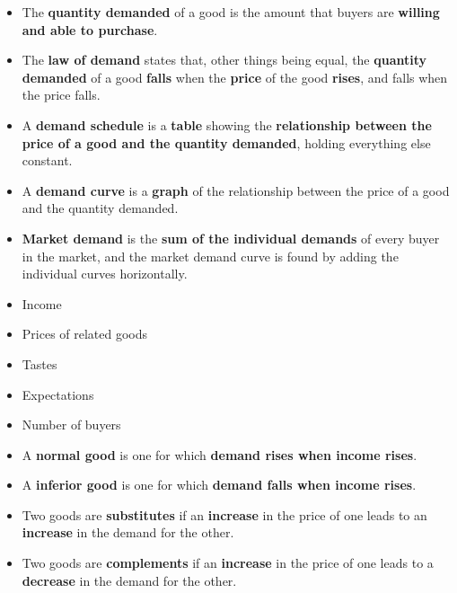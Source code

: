\documentclass[12pt,a4paper]{article}
\begin{document}

\begin{itemize}
    \item The \textbf{quantity demanded} of a good is the amount that buyers are \textbf{willing and able to purchase}.
    \item The \textbf{law of demand} states that, other things being equal, the \textbf{quantity demanded} of a good \textbf{falls} when the \textbf{price} of the good \textbf{rises}, and falls when the price falls.
    \item A \textbf{demand schedule} is a \textbf{table} showing the \textbf{relationship between the price of a good and the quantity demanded}, holding everything else constant.
    \item A \textbf{demand curve} is a \textbf{graph} of the relationship between the price of a good and the quantity demanded.
    \item \textbf{Market demand} is the \textbf{sum of the individual demands} of every buyer in the market, and the market demand curve is found by adding the individual curves horizontally.
\end{itemize}


\begin{itemize}
    \item Income
    \item Prices of related goods
    \item Tastes
    \item Expectations
    \item Number of buyers
\end{itemize}


\begin{itemize}
    \item A \textbf{normal good} is one for which \textbf{demand rises when income rises}.
    \item A \textbf{inferior good} is one for which \textbf{demand falls when income rises}.
\end{itemize}


\begin{itemize}
    \item Two goods are \textbf{substitutes} if an \textbf{increase} in the price of one leads to an \textbf{increase} in the demand for the other.
    \item Two goods are \textbf{complements} if an \textbf{increase} in the price of one leads to a \textbf{decrease} in the demand for the other.
\end{itemize}
\end{document}
